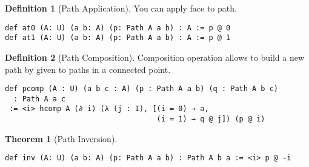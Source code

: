 \documentclass{article}
\theoremstyle{definition}
\newtheorem{definition}{Definition}
\newtheorem{theorem}{Theorem}
\begin{document}
\begin{definition}[Path Application]
You can apply face to path.
\begin{lstlisting}
def at0 (A: U) (a b: A) (p: Path A a b) : A := p @ 0
def at1 (A: U) (a b: A) (p: Path A a b) : A := p @ 1
\end{lstlisting}
\end{definition}

\begin{definition}[Path Composition]
Composition operation allows to build a new path by given to paths
in a connected point.
\begin{center}
\end{center}
\begin{lstlisting}[mathescape=true]
def pcomp (A : U) (a b c : A) (p : Path A a b) (q : Path A b c)
  : Path A a c
 := <i> hcomp A (∂ i) (λ (j : I), [(i = 0) → a,
                                   (i = 1) → q @ j]) (p @ i)
\end{lstlisting}
\end{definition}

\begin{theorem}[Path Inversion] \indent
\begin{lstlisting}[mathescape=true]
def inv (A: U) (a b: A) (p: Path A a b) : Path A b a := <i> p @ -i
\end{lstlisting}
\end{theorem}
\end{document}
